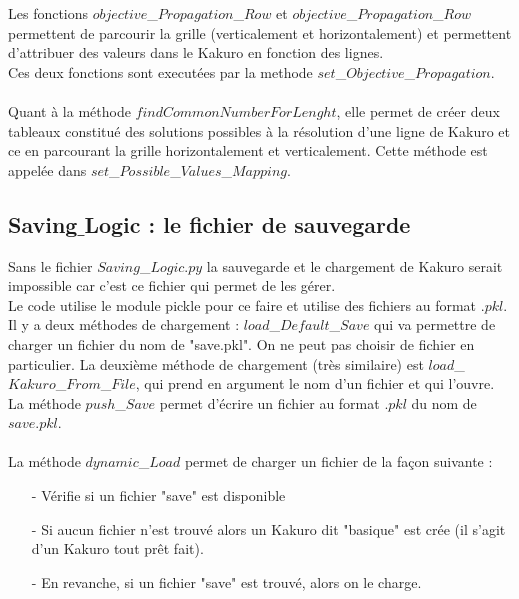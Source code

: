 \documentclass[12pt]{article}
\begin{document}
Les fonctions $objective$\_$Propagation$\_$Row$ et $objective$\_$Propagation$\_$Row$ permettent de parcourir la grille (verticalement et horizontalement) et permettent d'attribuer des valeurs dans le Kakuro en fonction des lignes. \\
Ces deux fonctions sont executées par la methode $set$\_$Objective$\_$Propagation$. \\ \\
Quant à la méthode $findCommonNumberForLenght$, elle permet de créer deux tableaux constitué des solutions possibles à la résolution d'une ligne de Kakuro et ce en parcourant la grille horizontalement et verticalement. Cette méthode est appelée dans $set$\_$Possible$\_$Values$\_$Mapping$. 

\subsection{Saving$\_$Logic : le fichier de sauvegarde}
Sans le fichier $Saving$\_$Logic.py$ la sauvegarde et le chargement de Kakuro serait impossible car c'est ce fichier qui permet de les gérer. \\
Le code utilise le module pickle pour ce faire et utilise des fichiers au format $.pkl$.  \\
Il y a deux méthodes de chargement : $load$\_$Default$\_$Save$ qui va permettre de charger un fichier du nom de "save.pkl". On ne peut pas choisir de fichier en particulier. La deuxième méthode de chargement (très similaire) est $load$\_$Kakuro$\_$From$\_$File$, qui prend en argument le nom d'un fichier et qui l'ouvre. \\
La méthode $push$\_$Save$ permet d'écrire un fichier au format $.pkl$ du nom de $save.pkl$. \\ \\
\newpage
La méthode $dynamic$\_$Load$ permet de charger un fichier de la façon suivante : \\
\begin{enumerate}
\item[-] Vérifie si un fichier "save" est disponible\\
\item[-] Si aucun fichier n'est trouvé alors un Kakuro dit "basique" est crée (il s'agit d'un Kakuro tout prêt fait). \\
\item[-] En revanche, si un fichier "save" est trouvé, alors on le charge.\\
\end{enumerate}
\end{document}
